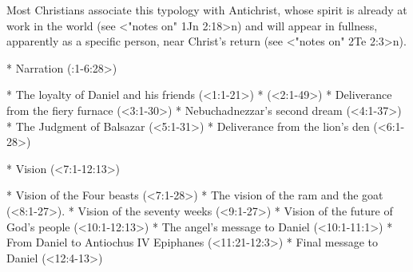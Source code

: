 Most Christians associate this typology with Antichrist, whose spirit is already at work in the world (see <"notes on" 1Jn 2:18>n) and will appear in fullness, apparently as a specific person, near Christ's return (see <"notes on" 2Te 2:3>n).



\Outline



\begitems
* Narration (:1-6:28>)

  \begitems
  * The loyalty of Daniel and his friends (<1:1-21>)
  * (<2:1-49>)
  * Deliverance from the fiery furnace (<3:1-30>)
  *  Nebuchadnezzar's second dream (<4:1-37>)
  * The Judgment of Balsazar (<5:1-31>)
  * Deliverance from the lion's den (<6:1-28>)
  \enditems

* Vision (<7:1-12:13>)

  \begitems
  * Vision of the Four beasts (<7:1-28>)
  * The vision of the ram and the goat (<8:1-27>).
  * Vision of the seventy weeks (<9:1-27>)
  * Vision of the future of God's people \nl (<10:1-12:13>)
    \begitems
    * The angel's message to Daniel \nl (<10:1-11:1>)
    * From Daniel to Antiochus IV Epiphanes \nl (<11:21-12:3>)
    * Final message to Daniel \nl (<12:4-13>)
    \enditems
  \enditems
\enditems

